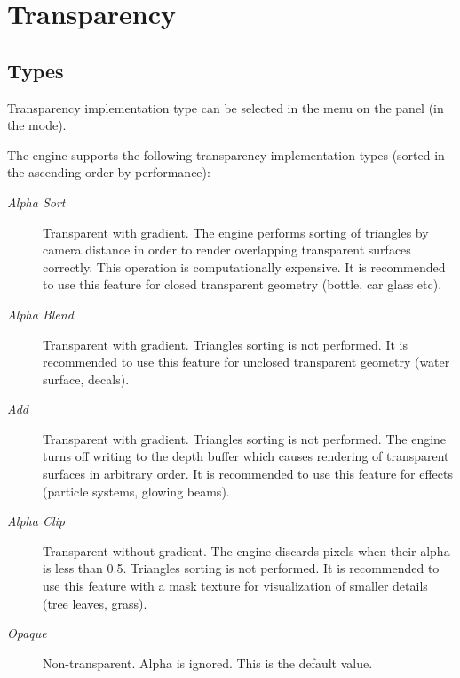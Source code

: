 \documentclass[a4paper,12pt,oneside]{sphinxmanual}
\begin{document}

\section{Transparency}
\label{materials:id3}\label{materials:index-2}

\subsection{Types}
\label{materials:id4}\label{materials:index-3}
Transparency implementation type can be selected in the  menu on the  panel (in the  mode).

The engine supports the following transparency implementation types (sorted in the ascending order by performance):
\begin{description}
\item[{\emph{Alpha Sort}}] \leavevmode
Transparent with gradient. The engine performs sorting of triangles by camera distance in order to render overlapping transparent surfaces correctly. This operation is computationally expensive. It is recommended to use this feature for closed transparent geometry (bottle, car glass etc).

\item[{\emph{Alpha Blend}}] \leavevmode
Transparent with gradient. Triangles sorting is not performed. It is recommended to use this feature for unclosed transparent geometry (water surface, decals).

\item[{\emph{Add}}] \leavevmode
Transparent with gradient. Triangles sorting is not performed. The engine turns off writing to the depth buffer which causes rendering of transparent surfaces in arbitrary order. It is recommended to use this feature for effects (particle systems, glowing beams).

\item[{\emph{Alpha Clip}}] \leavevmode
Transparent without gradient. The engine discards pixels when their alpha is less than 0.5. Triangles sorting is not performed. It is recommended to use this feature with a mask texture for visualization of smaller details (tree leaves, grass).

\item[{\emph{Opaque}}] \leavevmode
Non-transparent. Alpha is ignored. This is the default value.

\end{description}
\end{document}
